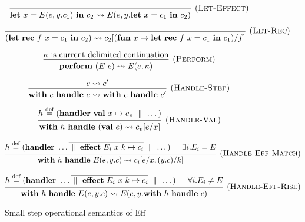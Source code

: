 \documentclass[class=article, crop=false]{standalone}
\renewcommand{\leadsto}{\rightsquigarrow}
\newcommand{\dmid}{\ \parallel \ }
\newcommand{\effFun}{\mathbf{fun}\ }
\newcommand{\effHandler}{\mathbf{handler}\ }
\newcommand{\effVal}{\mathbf{val}\ }
\newcommand{\effWith}{\mathbf{with}\ }
\newcommand{\effHandle}{\ \mathbf{handle}\ }
\newcommand{\effLet}{\mathbf{let}\ }
\newcommand{\effIn}{\ \mathbf{in}\ }
\newcommand{\effRec}{\mathbf{rec}\ }
\newcommand{\effEffect}{\mathbf{effect}\ }
\newcommand{\effPerform}{\mathbf{perform}\ }
\begin{document}
\begin{figure}[H]
    $$
    \begin{prooftree}
      \hypo{}
      \infer1[(\textsc{Let-Effect})]{\effLet x = E(e, y.c_1) \effIn c_2 \leadsto E(e, y.\effLet x = c_1 \effIn c_2)}
    \end{prooftree}
    $$
    
    $$
    \begin{prooftree}
      \hypo{}
      \infer1[(\textsc{Let-Rec})]{\left ( \effLet \effRec f\ x = c_1 \effIn c_2\right ) \leadsto c_2[(\effFun x \mapsto \effLet \effRec f\ x = c_1 \effIn c_1)/f]}
    \end{prooftree}
    $$
    
    $$
    \begin{prooftree}
      \hypo{\kappa \text{ is current delimited continuation}}
      \infer1[(\textsc{Perform})]{\effPerform (E\ e) \leadsto E(e, \kappa)}
    \end{prooftree}
    $$
    
    $$
    \begin{prooftree}
      \hypo{c \leadsto c'}
      \infer1[(\textsc{Handle-Step})]{\effWith e \effHandle c \leadsto \effWith e \effHandle c'}
    \end{prooftree}
    $$
    
    $$
    \begin{prooftree}
      \hypo{h \stackrel{\text{def}}{=} (\effHandler \effVal x \mapsto c_v \dmid \dots)}
      \infer1[(\textsc{Handle-Val})]{\effWith h \effHandle (\effVal e) \leadsto c_v[e/x]}
    \end{prooftree}
    $$
    
    $$
    \begin{prooftree}
      \hypo{h \stackrel{\text{def}}{=} (\effHandler \dots \overline{\dmid \effEffect E_i\ x\ k \mapsto c_i} \dmid \dots)}
      \hypo{\exists i. E_i = E}
      \infer2[(\textsc{Handle-Eff-Match})]{\effWith h \effHandle E(e, y.c) \leadsto c_i[e/x, (y.c)/k]}
    \end{prooftree}
    $$
    
    $$
    \begin{prooftree}
      \hypo{h \stackrel{\text{def}}{=} (\effHandler \dots \overline{\dmid \effEffect E_i\ x\ k \mapsto c_i} \dmid \dots)}
      \hypo{\forall i. E_i \neq E}
      \infer2[(\textsc{Handle-Eff-Rise})]{\effWith h \effHandle E(e, y.c) \leadsto E( e, y. \effWith h \effHandle c)}
    \end{prooftree}
    $$
    
    \caption{Small step operational semantics of Eff}
    \label{fig:full-semantics}
    \end{figure}
\end{document}
